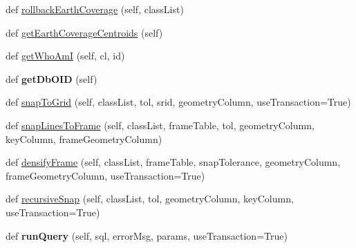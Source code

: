 \begin{DoxyCompactItemize}
\item 
def \mbox{\hyperlink{class_dsg_tools_1_1_factories_1_1_db_factory_1_1postgis_db_1_1_postgis_db_a6f43ff84be219d8dc9061838aeb436d2}{rollback\+Earth\+Coverage}} (self, class\+List)
\item 
def \mbox{\hyperlink{class_dsg_tools_1_1_factories_1_1_db_factory_1_1postgis_db_1_1_postgis_db_a79250fa15afdb832f3cccc0abc556a6e}{get\+Earth\+Coverage\+Centroids}} (self)
\item 
def \mbox{\hyperlink{class_dsg_tools_1_1_factories_1_1_db_factory_1_1postgis_db_1_1_postgis_db_a546fb6eb3f9d26674836af52c1e7d0b8}{get\+Who\+AmI}} (self, cl, id)
\item 
\mbox{\label{class_dsg_tools_1_1_factories_1_1_db_factory_1_1postgis_db_1_1_postgis_db_af73ce77d7e0162007c70016321e00d70}} 
def {\bfseries get\+Db\+O\+ID} (self)
\item 
def \mbox{\hyperlink{class_dsg_tools_1_1_factories_1_1_db_factory_1_1postgis_db_1_1_postgis_db_afed8fbc8f90f9ec042cf9f00b9bb4514}{snap\+To\+Grid}} (self, class\+List, tol, srid, geometry\+Column, use\+Transaction=True)
\item 
def \mbox{\hyperlink{class_dsg_tools_1_1_factories_1_1_db_factory_1_1postgis_db_1_1_postgis_db_a014921474a7fa941678e6cf0b5ebc865}{snap\+Lines\+To\+Frame}} (self, class\+List, frame\+Table, tol, geometry\+Column, key\+Column, frame\+Geometry\+Column)
\item 
def \mbox{\hyperlink{class_dsg_tools_1_1_factories_1_1_db_factory_1_1postgis_db_1_1_postgis_db_a26155c70bff315e00e48b4b5dc21137c}{densify\+Frame}} (self, class\+List, frame\+Table, snap\+Tolerance, geometry\+Column, frame\+Geometry\+Column, use\+Transaction=True)
\item 
def \mbox{\hyperlink{class_dsg_tools_1_1_factories_1_1_db_factory_1_1postgis_db_1_1_postgis_db_a378ae922a6592089abe153fb9fcd52ec}{recursive\+Snap}} (self, class\+List, tol, geometry\+Column, key\+Column, use\+Transaction=True)
\item 
\mbox{\label{class_dsg_tools_1_1_factories_1_1_db_factory_1_1postgis_db_1_1_postgis_db_acfd1d661e3e3bf2b8eb0b67040b7e3c4}} 
def {\bfseries run\+Query} (self, sql, error\+Msg, params, use\+Transaction=True)
\item 
\mbox{\label{class_dsg_tools_1_1_factories_1_1_db_factory_1_1postgis_db_1_1_postgis_db_af52a1ef46be8d0e4ed833079d2d27626}} 

\end{DoxyCompactItemize}
